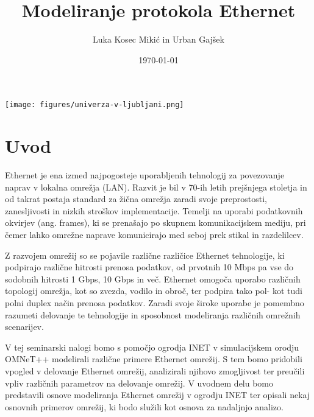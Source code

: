 \documentclass{article}
\begin{document}
\title{Modeliranje protokola Ethernet}
\author{Luka Kosec Mikić in Urban Gajšek}
\date{\today}

\maketitle

\begin{center}
    \texttt{[image: figures/univerza-v-ljubljani.png]}
\end{center}

\newpage

\section{Uvod}

Ethernet je ena izmed najpogosteje uporabljenih tehnologij za povezovanje naprav v
lokalna omrežja (LAN). Razvit je bil v 70-ih letih prejšnjega stoletja in od takrat
postaja standard za žična omrežja zaradi svoje preprostosti, zanesljivosti in nizkih
stroškov implementacije. Temelji na uporabi podatkovnih okvirjev (ang. frames),
ki se prenašajo po skupnem komunikacijskem mediju, pri čemer lahko omrežne naprave
komunicirajo med seboj prek stikal in razdelilcev.

Z razvojem omrežij so se pojavile različne različice Ethernet tehnologije,
ki podpirajo različne hitrosti prenosa podatkov, od prvotnih 10 Mbps pa vse do
sodobnih hitrosti 1 Gbps, 10 Gbps in več. Ethernet omogoča uporabo različnih topologij
omrežja, kot so zvezda, vodilo in obroč, ter podpira tako pol- kot tudi polni duplex
način prenosa podatkov. Zaradi svoje široke uporabe je pomembno razumeti delovanje te
tehnologije in sposobnost modeliranja različnih omrežnih scenarijev.

V tej seminarski nalogi bomo s pomočjo ogrodja INET v simulacijskem orodju OMNeT++
modelirali različne primere Ethernet omrežij. S tem bomo pridobili vpogled v delovanje
Ethernet omrežij, analizirali njihovo zmogljivost ter preučili vpliv različnih parametrov
na delovanje omrežij. V uvodnem delu bomo predstavili osnove modeliranja Ethernet omrežij
v ogrodju INET ter opisali nekaj osnovnih primerov omrežij, ki bodo služili kot osnova za
nadaljnjo analizo.

\newpage
\tableofcontents
\newpage
\end{document}
